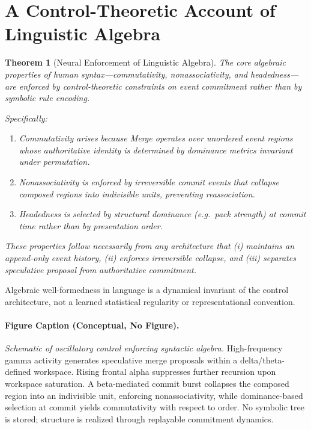 \documentclass[11pt]{article}
\newtheorem{theorem}{Theorem}
\begin{document}
\section{A Control-Theoretic Account of Linguistic Algebra}
\label{sec:control_algebra}

\begin{theorem}[Neural Enforcement of Linguistic Algebra]
\label{thm:ling_algebra}
The core algebraic properties of human syntax—commutativity, nonassociativity, and headedness—are enforced by control-theoretic constraints on event commitment rather than by symbolic rule encoding.

Specifically:
\begin{enumerate}
  \item \emph{Commutativity} arises because Merge operates over unordered event regions whose authoritative identity is determined by dominance metrics invariant under permutation.
  \item \emph{Nonassociativity} is enforced by irreversible commit events that collapse composed regions into indivisible units, preventing reassociation.
  \item \emph{Headedness} is selected by structural dominance (e.g.\ pack strength) at commit time rather than by presentation order.
\end{enumerate}

These properties follow necessarily from any architecture that (i) maintains an append-only event history, (ii) enforces irreversible collapse, and (iii) separates speculative proposal from authoritative commitment.
\end{theorem}

\begin{corollary}
Algebraic well-formedness in language is a dynamical invariant of the control architecture, not a learned statistical regularity or representational convention.
\end{corollary}

\paragraph{Figure Caption (Conceptual, No Figure).}
\emph{Schematic of oscillatory control enforcing syntactic algebra.}
High-frequency gamma activity generates speculative merge proposals within a delta/theta-defined workspace. Rising frontal alpha suppresses further recursion upon workspace saturation. A beta-mediated commit burst collapses the composed region into an indivisible unit, enforcing nonassociativity, while dominance-based selection at commit yields commutativity with respect to order. No symbolic tree is stored; structure is realized through replayable commitment dynamics.
\end{document}
